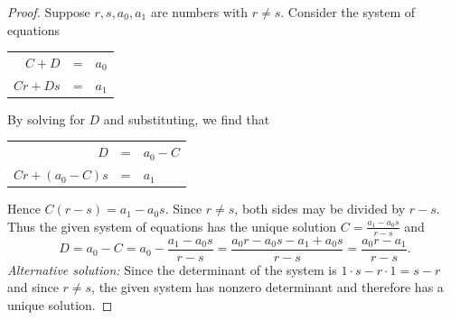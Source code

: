 \documentclass[14pt]{extarticle}
\newcommand{\dps}{\displaystyle}
\begin{document}
\begin{proof}
Suppose \(r, s, a_0, a_1\) are numbers with \(r \neq s\). Consider the system of equations
\begin{center}
\begin{tabular}{rcl}
\(C + D\) & = & \(a_0\) \\
\(Cr + Ds\) & = & \(a_1\)
\end{tabular}
\end{center}
By solving for $D$ and substituting, we find that
\begin{center}
\begin{tabular}{rcl}
\(D\) & = & \(a_0 - C\) \\
\(Cr + (a_0 - C)s\) & = & \(a_1\)
\end{tabular}
\end{center}
Hence \(C(r-s) = a_1 - a_0s\). Since \(r \neq s\), both sides may be divided by $r - s$. Thus the given system of 
equations has the unique solution \(\dps C = \frac{a_1 - a_0s}{r-s}\) and 
\[
D = a_0 - C = a_0 - \frac{a_1 - a_0s}{r-s} = \frac{a_0r - a_0s - a_1 + a_0s}{r-s} = \frac{a_0r - a_1}{r-s}.
\]
{\it Alternative solution:} Since the determinant of the system is \(1 \cdot s - r \cdot 1 = s - r\) and since 
\(r \neq s\), the given system has nonzero determinant and therefore has a unique solution.
\end{proof}
\end{document}
